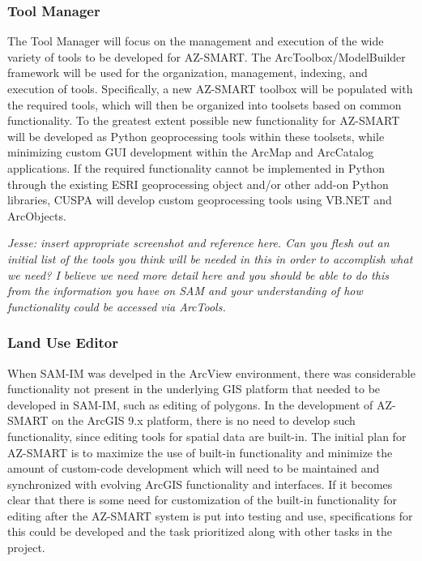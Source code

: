 \subsubsection{Tool Manager}

The Tool Manager will focus on the management and execution of the wide variety of tools to be developed for AZ-SMART.  The ArcToolbox/ModelBuilder framework will be used for the organization, management, indexing, and execution of tools.  Specifically, a new AZ-SMART toolbox will be populated with the required tools, which will then be organized into toolsets based on common functionality.  To the greatest extent possible new functionality for AZ-SMART will be developed as Python geoprocessing tools within these toolsets, while minimizing custom GUI development within the ArcMap and ArcCatalog applications.  If the required functionality cannot be implemented in Python through the existing ESRI geoprocessing object and/or other add-on Python libraries, CUSPA will develop custom geoprocessing tools using VB.NET and ArcObjects.

\emph{Jesse: insert appropriate screenshot and reference here.  Can you flesh out an initial list of the tools you think will be needed in this in order to accomplish what we need?  I believe we need more detail here and you should be able to do this from the information you have on SAM and your understanding of how functionality could be accessed via ArcTools.}

\subsubsection{Land Use Editor}
When SAM-IM was develped in the ArcView environment, there was considerable functionality not present in the underlying GIS platform that needed to be developed in SAM-IM, such as editing of polygons.  In the development of AZ-SMART on the ArcGIS 9.x platform, there is no need to develop such functionality, since editing tools for spatial data are built-in.  The initial plan for AZ-SMART is to maximize the use of built-in functionality and minimize the amount of custom-code development which will need to be maintained and synchronized with evolving ArcGIS functionality and interfaces.  If it becomes clear that there is some need for customization of the built-in functionality for editing after the AZ-SMART system is put into testing and use, specifications for this could be developed and the task prioritized along with other tasks in the project.

